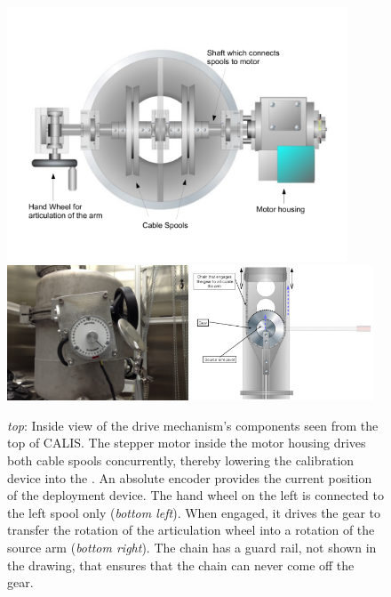 \begin{figure}[htbp]
 \centering
\includegraphics[width=0.9\textwidth]{Figures/gearDrawing}
  \includegraphics[width=0.48\textwidth]{Figures/ArticulationProtractor_IMG_2667.JPG}
  \includegraphics[width=0.48\textwidth]{Figures/sourceArmArticulation.png}
  \caption{\textit{top}: Inside view of the drive mechanism's components seen from the top of CALIS. The stepper motor inside the motor housing drives both cable spools concurrently, thereby lowering the calibration device into the \lsv. An absolute encoder provides the current position of the deployment device. The hand wheel on the left is connected to the left spool only (\textit{bottom left}). When engaged, it drives the gear to transfer the rotation of the articulation wheel into a rotation of the source arm (\textit{bottom right}). The chain has a guard rail, not shown in the drawing, that ensures that the chain can never come off the gear.}
  \label{fig:sourceArmRotation}
\end{figure} 

